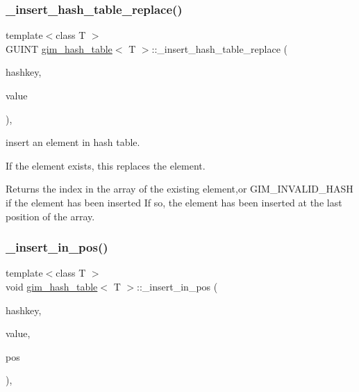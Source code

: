 \subsubsection{\texorpdfstring{\+\_\+insert\+\_\+hash\+\_\+table\+\_\+replace()}{\_insert\_hash\_table\_replace()}\hspace{0.1cm}{\footnotesize\ttfamily [2/2]}}
{\footnotesize\ttfamily template$<$class T $>$ \\
G\+U\+I\+NT \hyperlink{classgim__hash__table}{gim\+\_\+hash\+\_\+table}$<$ T $>$\+::\+\_\+insert\+\_\+hash\+\_\+table\+\_\+replace (\begin{DoxyParamCaption}\item[{G\+U\+I\+NT}]{hashkey,  }\item[{const T \&}]{value }\end{DoxyParamCaption})\hspace{0.3cm}{\ttfamily [inline]}, {\ttfamily [protected]}}



insert an element in hash table. 

If the element exists, this replaces the element. \begin{DoxyReturn}{Returns}
the index in the array of the existing element,or G\+I\+M\+\_\+\+I\+N\+V\+A\+L\+I\+D\+\_\+\+H\+A\+SH if the element has been inserted If so, the element has been inserted at the last position of the array. 
\end{DoxyReturn}
\mbox{\label{classgim__hash__table_a3eacaf88e1b18815c0b89d368d77a93a}} 
\subsubsection{\texorpdfstring{\+\_\+insert\+\_\+in\+\_\+pos()}{\_insert\_in\_pos()}\hspace{0.1cm}{\footnotesize\ttfamily [1/2]}}
{\footnotesize\ttfamily template$<$class T $>$ \\
void \hyperlink{classgim__hash__table}{gim\+\_\+hash\+\_\+table}$<$ T $>$\+::\+\_\+insert\+\_\+in\+\_\+pos (\begin{DoxyParamCaption}\item[{G\+U\+I\+NT}]{hashkey,  }\item[{const T \&}]{value,  }\item[{G\+U\+I\+NT}]{pos }\end{DoxyParamCaption})\hspace{0.3cm}{\ttfamily [inline]}, {\ttfamily [protected]}}



